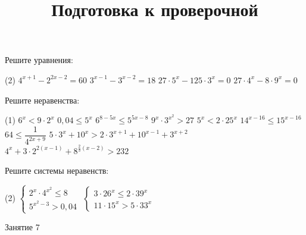 \begin{homework}[number=3]
	\begin{listofex}
		\item Решите уравнения:
		\begin{tasks}(2)
			\task \( 4^{x+1}-2^{2x-2}=60 \)
			\task \( 3^{x-1}-3^{x-2}=18 \)
			\task \( 27 \cdot 5^x-125 \cdot 3^x=0 \)
			\task \( 27 \cdot 4^x - 8 \cdot 9^x=0 \)
		\end{tasks}
		\item Решите неравенства: %
		\begin{tasks}(1)
			\task \( 6^x<9 \cdot 2^x \)
			\task \( 0,04 \le 5^x \)
			\task \( 6^{8-5x} \le 5^{5x-8} \)
			\task \( 9^x \cdot 3^{x^2} > 27 \)
			\task \( 5^x < 2 \cdot 25^x \)
			\task \( 14^{x-16} \le 15^{x-16} \)
			\task \( 64 \le \dfrac{1}{4^{2x+9}} \)
			\task \( 5 \cdot 3^x + 10^x > 2 \cdot 3^{x+1} + 10^{x-1} + 3^{x+2} \)
			\task \( 4^x + 3 \cdot 2^{2(x-1)}+8^{\frac{2}{3}(x-2)}>232 \)
		\end{tasks}
		\item Решите системы неравенств:
		\begin{tasks}(2)
			\task \( \begin{cases} 2^x \cdot 4 ^{x^2} \le 8 \\ 5^{x^2-3} > 0,04 \end{cases} \)
			\task \( \begin{cases} 3 \cdot 26^x \le 2 \cdot 39^x \\ 11 \cdot 15^x > 5 \cdot 33^x \end{cases} \)
		\end{tasks}
	\end{listofex}
\end{homework}
	
\begin{class}[number=7]
	\title{Подготовка к проверочной}
	\begin{listofex}
		\item Занятие 7
	\end{listofex}
\end{class}
	
\begin{exam}
	\begin{listofex}
		\item 
	\end{listofex}
\end{exam}

